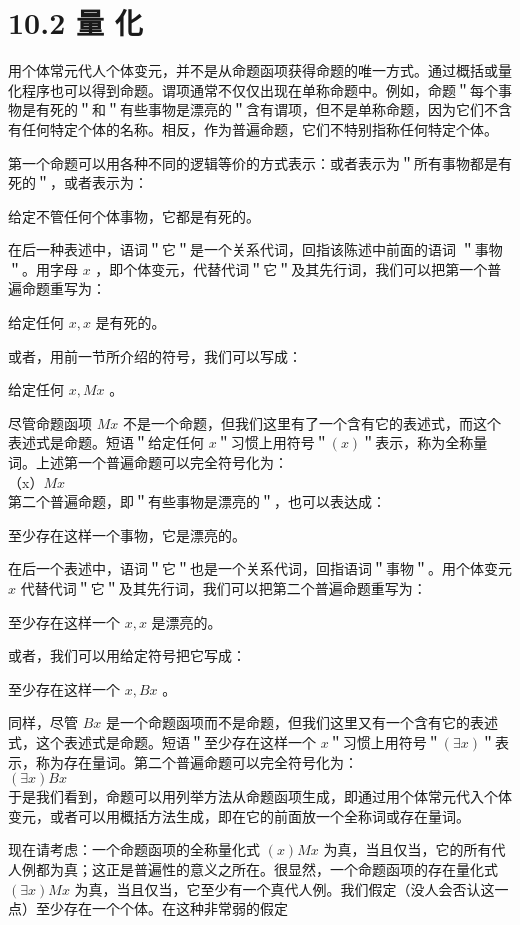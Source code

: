 \section*{10.2 量 化}
用个体常元代人个体变元，并不是从命题函项获得命题的唯一方式。通过概括或量化程序也可以得到命题。谓项通常不仅仅出现在单称命题中。例如，命题＂每个事物是有死的＂和＂有些事物是漂亮的＂含有谓项，但不是单称命题，因为它们不含有任何特定个体的名称。相反，作为普遍命题，它们不特别指称任何特定个体。

第一个命题可以用各种不同的逻辑等价的方式表示：或者表示为＂所有事物都是有死的＂，或者表示为：

给定不管任何个体事物，它都是有死的。

在后一种表述中，语词＂它＂是一个关系代词，回指该陈述中前面的语词 ＂事物＂。用字母 $x$ ，即个体变元，代替代词＂它＂及其先行词，我们可以把第一个普遍命题重写为：

给定任何 $x, x$ 是有死的。

或者，用前一节所介绍的符号，我们可以写成：

给定任何 $x, M x$ 。

尽管命题函项 $M x$ 不是一个命题，但我们这里有了一个含有它的表述式，而这个表述式是命题。短语＂给定任何 $x$＂习惯上用符号＂$(x)$＂表示，称为全称量词。上述第一个普遍命题可以完全符号化为：\\
（x）$M x$\\
第二个普遍命题，即＂有些事物是漂亮的＂，也可以表达成：

至少存在这样一个事物，它是漂亮的。

在后一个表述中，语词＂它＂也是一个关系代词，回指语词＂事物＂。用个体变元 $x$ 代替代词＂它＂及其先行词，我们可以把第二个普遍命题重写为：

至少存在这样一个 $x, x$ 是漂亮的。

或者，我们可以用给定符号把它写成：

至少存在这样一个 $x, B x$ 。

同样，尽管 $B x$ 是一个命题函项而不是命题，但我们这里又有一个含有它的表述式，这个表述式是命题。短语＂至少存在这样一个 $x$＂习惯上用符号＂$(\exists x)$＂表示，称为存在量词。第二个普遍命题可以完全符号化为：\\
$(\exists x) B x$\\
于是我们看到，命题可以用列举方法从命题函项生成，即通过用个体常元代入个体变元，或者可以用概括方法生成，即在它的前面放一个全称词或存在量词。

现在请考虑：一个命题函项的全称量化式 $(x) M x$ 为真，当且仅当，它的所有代人例都为真；这正是普遍性的意义之所在。很显然，一个命题函项的存在量化式 $(\exists x) M x$ 为真，当且仅当，它至少有一个真代人例。我们假定（没人会否认这一点）至少存在一个个体。在这种非常弱的假定

